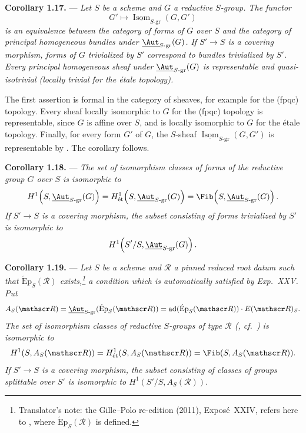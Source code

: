 \medskip\noindent\textbf{Corollary 1.17.} ---
{\itshape Let \(S\) be a scheme and \(G\) a reductive \(S\)-group. The functor
\[
  G'\longmapsto
  \underline{\operatorname{Isom}}_{S\text{-}\mathrm{gr}}(G,G')
\]
is an equivalence between the category of forms of \(G\) over \(S\)
and the category of principal homogeneous bundles under
\(\underline{\Aut}_{S\text{-}\mathrm{gr}}(G)\).
If \(S'\to S\) is a covering morphism, forms of \(G\)
trivialized by \(S'\) correspond to bundles trivialized by \(S'\).
Every principal homogeneous sheaf under
\(\underline{\Aut}_{S\text{-}\mathrm{gr}}(G)\) is representable and
quasi-isotrivial \textup{(}locally trivial for the étale topology\textup{)}.}

The first assertion is formal in the category of sheaves, for example
for the \textup{(fpqc)} topology. Every sheaf locally isomorphic to
\(G\) for the \textup{(fpqc)} topology is representable, since \(G\)
is affine over \(S\), and is locally isomorphic to \(G\) for the
étale topology. Finally, for every form \(G'\) of \(G\), the
\(S\)-sheaf
\(\underline{\operatorname{Isom}}_{S\text{-}\mathrm{gr}}(G,G')\) is
representable by . The corollary follows.

\medskip\noindent\textbf{Corollary 1.18.} ---
{\itshape The set of isomorphism classes of forms of the reductive
group \(G\) over \(S\) is isomorphic to
\[
  H^1\!\left(S,\underline{\Aut}_{S\text{-}\mathrm{gr}}(G)\right)
  =
  H^1_{\mathrm{\acute et}}\!
    \left(S,\underline{\Aut}_{S\text{-}\mathrm{gr}}(G)\right)
  =
  \Fib\!\left(S,\underline{\Aut}_{S\text{-}\mathrm{gr}}(G)\right).
\]
If \(S'\to S\) is a covering morphism, the subset consisting of forms
trivialized by \(S'\) is isomorphic to
\[
  H^1\!\left(S'/S,\underline{\Aut}_{S\text{-}\mathrm{gr}}(G)\right).
\]}

\medskip\noindent\textbf{Corollary 1.19.} ---
{\itshape Let \(S\) be a scheme and \(\mathscr R\) a pinned reduced root
datum such that \(\operatorname{\acute{E}p}_S(\mathscr R)\)
exists,\footnote{Translator's note: the Gille--Polo re-edition (2011), Exposé~XXIV, refers here to
, where \(\operatorname{\acute{E}p}_S(\mathscr R)\)
is defined.} a
condition which is automatically satisfied by Exp.~XXV. Put
\[
  A_S(\mathscr R)
  =
  \underline{\Aut}_{S\text{-}\mathrm{gr}}
    (\operatorname{\acute{E}p}_S(\mathscr R))
  =
  \operatorname{ad}(\operatorname{\acute{E}p}_S(\mathscr R))
  \cdot E(\mathscr R)_S.
\]
The set of isomorphism classes of reductive \(S\)-groups
of type \(\mathscr R\) (, cf.\
) is isomorphic to
\[
  H^1(S,A_S(\mathscr R))
  =
  H^1_{\mathrm{\acute et}}(S,A_S(\mathscr R))
  =
  \Fib(S,A_S(\mathscr R)).
\]
If \(S'\to S\) is a covering morphism, the subset
consisting of classes of groups splittable over \(S'\) is isomorphic
to \(H^1(S'/S,A_S(\mathscr R))\).}

